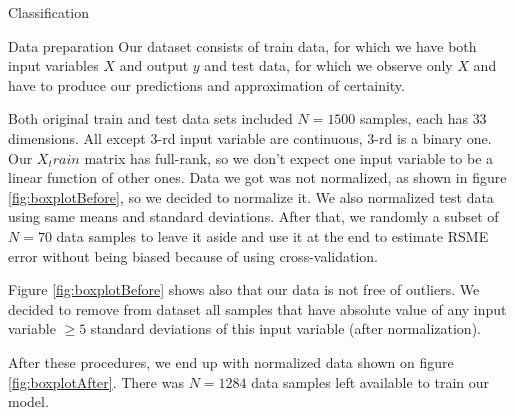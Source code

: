 \documentclass{article}
\begin{document}
\begin{section}{Classification}
\begin{subsection}{Data preparation}
Our dataset consists of train data, for which we have both input variables $X$ and output $y$ and test data, for which we observe only $X$ and have to produce our predictions and approximation of certainity.

Both original train and test data sets included $N=1500$ samples, each has $33$ dimensions. All except $3$-rd input variable are continuous, $3$-rd is a binary one. Our $X_train$ matrix has full-rank, so we don't expect one input variable to be a linear function of other ones. 
Data we got was not normalized, as shown in figure \ref{fig:boxplotBefore}, so we decided to normalize it. We also normalized test data using same means and standard deviations. After that, we randomly a subset of $N=70$ data samples to leave it aside and use it at the end to estimate RSME error without being biased because of using cross-validation. 

Figure \ref{fig:boxplotBefore} shows also that our data is not free of outliers. We decided to remove from dataset all samples that have absolute value of any input variable $\ge 5$ standard deviations of this input variable (after normalization).

After these procedures, we end up with normalized data shown on figure \ref{fig:boxplotAfter}. There was $N=1284$ data samples left available to train our model.

\begin{figure}[!h]
\center
{}
\hfill
{}
\caption{}
\end{figure}


\end{subsection}
\end{section}
\end{document}
